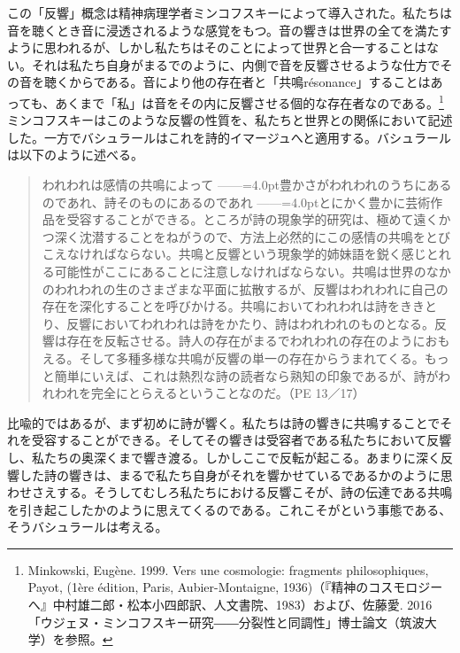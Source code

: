 \documentclass[b5j,twoside,twocolumn]{utarticle}
\begin{document}
この「反響」概念は精神病理学者ミンコフスキーによって導入された。私たちは音を聴くとき音に浸透されるような感覚をもつ。音の響きは世界の全てを満たすように思われるが、しかし私たちはそのことによって世界と合一することはない。それは私たち自身がまるでのように、内側で音を反響させるような仕方でその音を聴くからである。音により他の存在者と「共鳴résonance」することはあっても、あくまで「私」は音をその内に反響させる個的な存在者なのである。\footnote{Minkowski, Eugène. 1999. Vers une cosmologie: fragments philosophiques, Payot, (1ère édition, Paris, Aubier-Montaigne, 1936)（『精神のコスモロジーへ』中村雄二郎・松本小四郎訳、人文書院、1983）および、佐藤愛. 2016「ウジェヌ・ミンコフスキー研究――分裂性と同調性」博士論文（筑波大学）を参照。}ミンコフスキーはこのような反響の性質を、私たちと世界との関係において記述した。一方でバシュラールはこれを詩的イマージュへと適用する。バシュラールは以下のように述べる。
\begin{quote}
われわれは感情の共鳴によって\tbaselineshift =2.5pt ------\tbaselineshift =4.0pt豊かさがわれわれのうちにあるのであれ、詩そのものにあるのであれ\tbaselineshift =2.5pt ------\tbaselineshift =4.0ptとにかく豊かに芸術作品を受容することができる。ところが詩の現象学的研究は、極めて遠くかつ深く沈潜することをねがうので、方法上必然的にこの感情の共鳴をとびこえなければならない。共鳴と反響という現象学的姉妹語を鋭く感じとれる可能性がここにあることに注意しなければならない。共鳴は世界のなかのわれわれの生のさまざまな平面に拡散するが、反響はわれわれに自己の存在を深化することを呼びかける。共鳴においてわれわれは詩をききとり、反響においてわれわれは詩をかたり、詩はわれわれのものとなる。反響は存在を反転させる。詩人の存在がまるでわれわれの存在のようにおもえる。そして多種多様な共鳴が反響の単一の存在からうまれてくる。もっと簡単にいえば、これは熱烈な詩の読者なら熟知の印象であるが、詩がわれわれを完全にとらえるということなのだ。（PE 13／17）
\end{quote}

比喩的ではあるが、まず初めに詩が響く。私たちは詩の響きに共鳴することでそれを受容することができる。そしてその響きは受容者である私たちにおいて反響し、私たちの奥深くまで響き渡る。しかしここで反転が起こる。あまりに深く反響した詩の響きは、まるで私たち自身がそれを響かせているであるかのように思わせさえする。そうしてむしろ私たちにおける反響こそが、詩の伝達である共鳴を引き起こしたかのように思えてくるのである。これこそがという事態である、そうバシュラールは考える。
\end{document}
